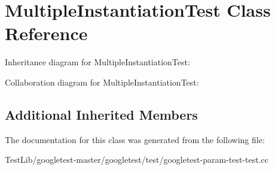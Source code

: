 \hypertarget{classMultipleInstantiationTest}{}\section{Multiple\+Instantiation\+Test Class Reference}
\label{classMultipleInstantiationTest}


Inheritance diagram for Multiple\+Instantiation\+Test\+:


Collaboration diagram for Multiple\+Instantiation\+Test\+:
\subsection*{Additional Inherited Members}


The documentation for this class was generated from the following file\+:\begin{DoxyCompactItemize}
\item 
Test\+Lib/googletest-\/master/googletest/test/googletest-\/param-\/test-\/test.\+cc\end{DoxyCompactItemize}

